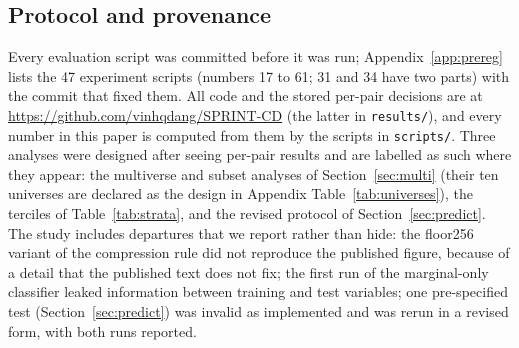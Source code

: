 \subsection{Protocol and provenance}\label{sec:protocol}
Every evaluation script was committed before it was run; Appendix~\ref{app:prereg} lists the 47 experiment scripts (numbers 17 to 61; 31 and 34 have two parts) with the commit that fixed them. All code and the stored per-pair decisions are at \url{https://github.com/vinhqdang/SPRINT-CD} (the latter in \texttt{results/}), and every number in this paper is computed from them by the scripts in \texttt{scripts/}. Three analyses were designed after seeing per-pair results and are labelled as such where they appear: the multiverse and subset analyses of Section~\ref{sec:multi} (their ten universes are declared as the design in Appendix Table~\ref{tab:universes}), the terciles of Table~\ref{tab:strata}, and the revised protocol of Section~\ref{sec:predict}. The study includes departures that we report rather than hide: the floor256 variant of the compression rule did not reproduce the published figure, because of a detail that the published text does not fix; the first run of the marginal-only classifier leaked information between training and test variables; one pre-specified test (Section~\ref{sec:predict}) was invalid as implemented and was rerun in a revised form, with both runs reported.

